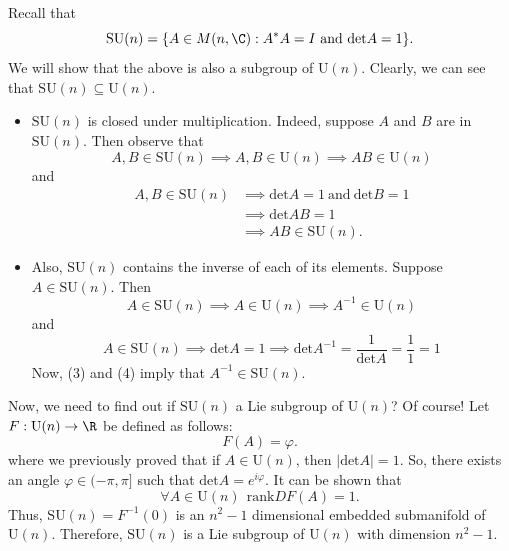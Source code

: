 \begin{eg}
   Recall that  
   \[  \text{SU}(n) = \{  A \in M(n, \C) : A^{*}A = I \ \text{and} \ \text{det} A = 1  \}. \]
   We will show that the above is also a subgroup of \( \text{U}(n) \). Clearly, we can see that \( \text{SU}(n) \subseteq  \text{U}(n) \).
   \begin{itemize}
       \item \( \text{SU}(n)  \) is closed under multiplication. Indeed, suppose \( A  \) and \( B  \) are in \( \text{SU}(n) \). Then observe that 
           \[ A,B \in \text{SU}(n) \implies A, B \in \text{U}(n) \implies AB \in \text{U}(n) \tag{1}  \]
           and
           \begin{align*}
               A,B \in \text{SU}(n) &\implies \text{det}A = 1 \ \text{and} \ \text{det}B = 1   \\
                                    &\implies \text{det}AB = 1  \\
                                    &\implies AB \in \text{SU}(n).
           \end{align*}
        \item Also, \( \text{SU}(n)  \) contains the inverse of each of its elements. Suppose \( A \in \text{SU}(n) \). Then
            \[  A \in \text{SU}(n) \implies A \in \text{U}(n) \implies A^{-1} \in \text{U}(n) \tag{3} \]
            and
            \[  A \in \text{SU}(n) \implies \text{det}A = 1 \implies \text{det}A^{-1} = \frac{ 1 }{ \text{det}A  }  = \frac{ 1 }{ 1 }  = 1 \tag{4}  \]
            Now, (3) and (4) imply that \( A^{-1} \in \text{SU}(n) \).
   \end{itemize}
   Now, we need to find out if \( \text{SU}(n)  \) a Lie subgroup of \( \text{U}(n) \)? Of course! Let \( F: \text{U}(n) \to \R  \) be defined as follows:
   \[  F(A) = \varphi. \]
   where we previously proved that if \( A \in \text{U}(n)  \), then \( | \text{det} A  |  = 1  \). So, there exists an angle \( \varphi \in (-\pi, \pi] \) such that \( \text{det} A = e^{i \varphi} \).
   It can be shown that 
   \[  \forall A \in \text{U}(n) \ \ \text{rank} DF(A) = 1.  \]
   Thus, \( \text{SU}(n) = F^{-1}(0)  \) is an \( n^{2} - 1  \) dimensional embedded submanifold of \( \text{U}(n) \). Therefore, \( \text{SU}(n) \) is a Lie subgroup of \( \text{U}(n) \) with dimension \( n^{2} - 1  \).
\end{eg}




